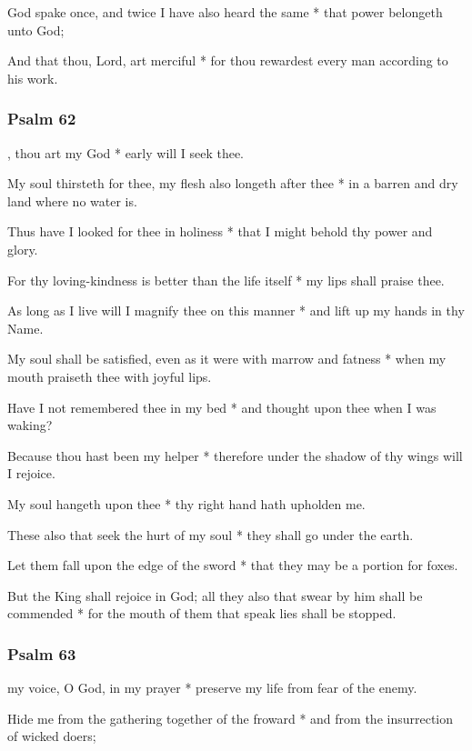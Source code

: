 God spake once, and twice I have also heard the same * that power belongeth unto God;

And that thou, Lord, art merciful * for thou rewardest every man according to his work.

\subsubsection{Psalm 62}


, thou art my God * early will I seek thee.

My soul thirsteth for thee, my flesh also longeth after thee * in a barren and dry land where no water is.

Thus have I looked for thee in holiness * that I might behold thy power and glory.

For thy loving-kindness is better than the life itself * my lips shall praise thee.

As long as I live will I magnify thee on this manner * and lift up my hands in thy Name.

My soul shall be satisfied, even as it were with marrow and fatness * when my mouth praiseth thee with joyful lips.

Have I not remembered thee in my bed * and thought upon thee when I was waking?

Because thou hast been my helper * therefore under the shadow of thy wings will I rejoice.

My soul hangeth upon thee * thy right hand hath upholden me.

These also that seek the hurt of my soul * they shall go under the earth.

Let them fall upon the edge of the sword * that they may be a portion for foxes.

But the King shall rejoice in God; all they also that swear by him shall be commended * for the mouth of them that speak lies shall be stopped.

\subsubsection{Psalm 63}


 my voice, O God, in my prayer * preserve my life from fear of the enemy.

Hide me from the gathering together of the froward * and from the insurrection of wicked doers;

